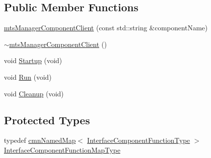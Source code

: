 \subsection*{Public Member Functions}
\begin{DoxyCompactItemize}
\item 
\hyperlink{classmts_manager_component_client_af587303a834c7dbe86cc024ba1354c98}{mts\+Manager\+Component\+Client} (const std\+::string \&component\+Name)
\item 
\hyperlink{classmts_manager_component_client_ad0e2d333466314a3aade1e76df5314ed}{$\sim$mts\+Manager\+Component\+Client} ()
\item 
void \hyperlink{classmts_manager_component_client_a24261b416cd8c9389842d6a29ddb4cc7}{Startup} (void)
\item 
void \hyperlink{classmts_manager_component_client_a9bd3a578609dfafe654f5646eb7a0c74}{Run} (void)
\item 
void \hyperlink{classmts_manager_component_client_aadabafb080cf1bce69eb0bdfc5192dac}{Cleanup} (void)
\end{DoxyCompactItemize}
\subsection*{Protected Types}
\begin{DoxyCompactItemize}
\item 
typedef \hyperlink{classcmn_named_map}{cmn\+Named\+Map}$<$ \hyperlink{structmts_manager_component_client_1_1_interface_component_function_type}{Interface\+Component\+Function\+Type} $>$ \hyperlink{classmts_manager_component_client_a6f0f9dde52834d02169c3b1feda1cab5}{Interface\+Component\+Function\+Map\+Type}
\end{DoxyCompactItemize}
